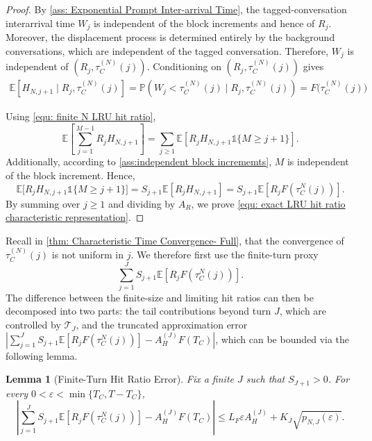 \documentclass{article}
\newtheorem{lemma}[lemma]{Lemma}
\theoremstyle{definition}
\newcommand{\E}{\mathbb E}
\newcommand{\pro}{\mathbb P}
\newcommand{\one}{\mathds{1}}
\begin{document}
\begin{proof}
    By \cref{ass: Exponential Prompt Inter-arrival Time}, the tagged-conversation interarrival time $W_j$ is independent of the block increments and hence of $R_j$. Moreover, the displacement process is determined entirely by the background conversations, which are independent of the tagged conversation. Therefore, $W_j$ is independent of $(R_j,\tau_C^{(N)}(j))$. Conditioning on $(R_j,\tau_C^{(N)}(j))$ gives
    \begin{align*}
        \E\left[H_{N,j+1}\mid R_j,\tau_C^{(N)}(j)\right]
        =\pro\left(W_j<\tau_C^{(N)}(j)\mid R_j,\tau_C^{(N)}(j)\right) = F \big (\tau^{(N)}_C(j)\big) %
    \end{align*}
    
    Using \eqref{equ: finite N LRU hit ratio},
    \begin{equation*}
        \E\left[\sum_{j=1}^{M-1}R_jH_{N,j+1}\right]= \sum_{j\geq1}\E\left[R_jH_{N,j+1}\one\{M\geq j+1\}\right].
    \end{equation*}
    Additionally, according to \cref{ass:independent block incrememts}, $M$ is independent of the block increment. Hence,
    \begin{equation}
    \label{equ: conditional hit probability}
        \E\Big[R_jH_{N,j+1}\one\{M\geq j+1\}\Big] =S_{j+1}\E\left[R_jH_{N,j+1}\right] =S_{j+1}\E\left[R_jF(\tau^{N}_C(j))\right].
    \end{equation}
    By summing over $j\geq 1$ and dividing by $A_R$, we prove \eqref{equ: exact LRU hit ratio characteristic representation}.
\end{proof}

Recall in \cref{thm: Characteristic Time Convergence- Full}, that the convergence of $\tau^{(N)}_C(j)$ is not uniform in $j$. We therefore first use the finite-turn proxy
\begin{equation}
    \label{equ: finite turn proxy J}
    \sum_{j=1}^{J}S_{j+1}\E\left[R_jF(\tau^{N}_C(j))\right].
\end{equation}
The difference between the finite-size and limiting hit ratios can then be decomposed into two parts: the tail contributions beyond turn $J$, which are controlled by $\mathcal T_J$, and the truncated approximation error $\left| \sum_{j=1}^{J}S_{j+1}\E\left[R_jF(\tau^{N}_C(j))\right]- A_H^{(J)}F(T_C) \right|$, which can be bounded via the following lemma.


\begin{lemma}[Finite-Turn Hit Ratio Error]
    \label{lem: Finite Turn Hit Ratio Error}
        Fix a finite $J$ such that $S_{J+1}>0$. For every $0<\varepsilon<\min\{T_C,T-T_C\}$,
    \begin{equation}
    \label{equ: finite turn hit ratio error}
        \left| \sum_{j=1}^{J}S_{j+1}\E\left[R_jF(\tau^{N}_C(j))\right]- A_H^{(J)}F(T_C)\right|\leq L_F \varepsilon A_H^{(J)}+K_J\sqrt{p_{N,J}(\varepsilon)}.
    \end{equation}
\end{lemma}
\end{document}
